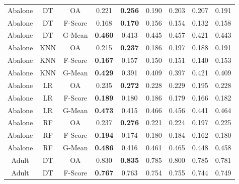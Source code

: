 \begin{longtable}{ccccccccc}
\bottomrule
\endlastfoot
           Abalone &         DT &      OA &          0.221 & \textbf{0.256} &          0.190 &          0.203 &          0.207 &          0.191 \\
           Abalone &         DT & F-Score &          0.168 & \textbf{0.170} &          0.156 &          0.154 &          0.132 &          0.158 \\
           Abalone &         DT &  G-Mean & \textbf{0.460} &          0.413 &          0.445 &          0.457 &          0.421 &          0.443 \\
           Abalone &        KNN &      OA &          0.215 & \textbf{0.237} &          0.186 &          0.197 &          0.188 &          0.191 \\
           Abalone &        KNN & F-Score & \textbf{0.167} &          0.157 &          0.150 &          0.151 &          0.140 &          0.153 \\
           Abalone &        KNN &  G-Mean & \textbf{0.429} &          0.391 &          0.409 &          0.397 &          0.421 &          0.409 \\
           Abalone &         LR &      OA &          0.235 & \textbf{0.272} &          0.228 &          0.229 &          0.195 &          0.228 \\
           Abalone &         LR & F-Score & \textbf{0.189} &          0.180 &          0.186 &          0.179 &          0.166 &          0.182 \\
           Abalone &         LR &  G-Mean & \textbf{0.473} &          0.415 &          0.466 &          0.456 &          0.441 &          0.464 \\
           Abalone &         RF &      OA &          0.237 & \textbf{0.276} &          0.221 &          0.224 &          0.197 &          0.225 \\
           Abalone &         RF & F-Score & \textbf{0.194} &          0.174 &          0.180 &          0.184 &          0.162 &          0.180 \\
           Abalone &         RF &  G-Mean & \textbf{0.486} &          0.416 &          0.461 &          0.465 &          0.448 &          0.458 \\
             Adult &         DT &      OA &          0.830 & \textbf{0.835} &          0.785 &          0.800 &          0.785 &          0.781 \\
             Adult &         DT & F-Score & \textbf{0.767} &          0.763 &          0.754 &          0.755 &          0.744 &          0.749 \\

\end{longtable}

